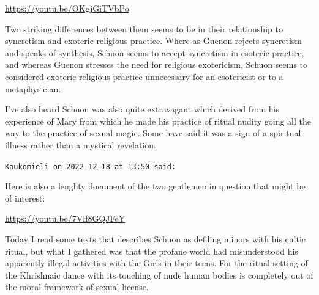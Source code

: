 \begin{footnotesize}
\begin{sffamily}
\url{https://youtu.be/OKgjGiTVbPo}


Two striking differences between them seems to be in their relationship to syncretism and exoteric religious practice. Where as Guenon rejects syncretism and speaks of synthesis, Schuon seems to accept syncretism in esoteric practice, and whereas Guenon stresses the need for religious exotericism, Schuon seems to considered exoteric religious practice unnecessary for an esotericist or to a metaphysician.

I've also heard Schuon was also quite extravagant which derived from his experience of Mary from which he made his practice of ritual nudity going all the way to the practice of sexual magic. Some have said it was a sign of a spiritual illness rather than a mystical revelation.

\hfill

\texttt{Kaukomieli on 2022-12-18 at 13:50 said:}

Here is also a lenghty document of the two gentlemen in question that might be of interest:

\url{https://youtu.be/7Vlf8GQJFeY}


Today I read some texts that describes Schuon as defiling minors with his cultic ritual, but what I gathered was that the profane world had misunderstood his apparently illegal activities with the Girls in their teens. For the ritual setting of the Khrishnaic dance with its touching of nude human bodies is completely out of the moral framework of sexual license.

\hfill

\end{sffamily}
\end{footnotesize}


